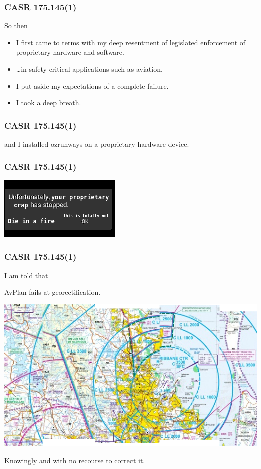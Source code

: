 \begin{frame}
\frametitle{CASR 175.145(1)}
\begin{block}{So then}
\begin{itemize}
\item<1-> I first came to terms with my deep resentment of legislated enforcement of proprietary hardware and software.
\item<2-> \ldots in safety-critical applications such as aviation.
\item<3-> I put aside my expectations of a complete failure.
\item<4-> I took a deep breath.
\end{itemize}
\end{block}
\end{frame}

\begin{frame}
\frametitle{CASR 175.145(1)}
\large
\begin{center}
and I installed ozrunways on a proprietary hardware device.
\end{center}
\end{frame}

\begin{frame}
\frametitle{CASR 175.145(1)}
\begin{center}
\includegraphics[height=0.2\textheight,natwidth=221,natheight=113]{image/unfortunately-stopped.png}
\end{center}
\end{frame}

\begin{frame}
\frametitle{CASR 175.145(1)}
\begin{center}
\tiny{I am told that}
\par
\large
AvPlan fails at georectification.
\par
\includegraphics[height=0.5\textheight,natwidth=534,natheight=300]{image/vtc-georectification.png}
\par
Knowingly and with no recourse to correct it.
\end{center}
\end{frame}

